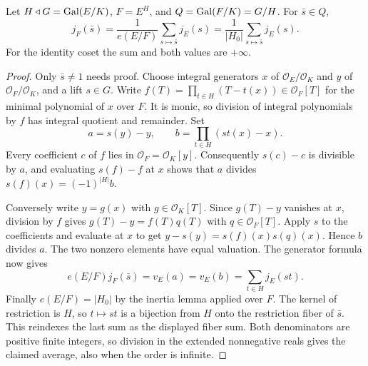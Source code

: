 \begin{lemma}
\label{fw:coset-ramification-average}
\leanok
Let $H\triangleleft G=\operatorname{Gal}(E/K)$, $F=E^H$, and $Q=\operatorname{Gal}(F/K)=G/H$.
For $\bar s\in Q$,
\[
 j_F(\bar s)=\frac1{e(E/F)}\sum_{s\mapsto\bar s}j_E(s)
            =\frac1{|H_0|}\sum_{s\mapsto\bar s}j_E(s).
\]
For the identity coset the sum and both values are $+\infty$.
\end{lemma}
\begin{proof}
Only $\bar s\ne1$ needs proof. Choose integral generators $x$ of
$\mathcal O_E/\mathcal O_K$ and $y$ of
$\mathcal O_F/\mathcal O_K$, and a lift $s\in G$.
Write $f(T)=\prod_{t\in H}(T-t(x))\in\mathcal O_F[T]$ for the
minimal polynomial of $x$ over $F$. It is monic, so division of integral
polynomials by $f$ has integral quotient and remainder.
Set
\[
 a=s(y)-y,\qquad b=\prod_{t\in H}(st(x)-x).
\]
Every coefficient $c$ of $f$ lies in $\mathcal O_F=\mathcal O_K[y]$.
Consequently $s(c)-c$ is divisible by $a$, and evaluating
$s(f)-f$ at $x$ shows that $a$ divides $s(f)(x)=(-1)^{|H|}b$.

Conversely write $y=g(x)$ with $g\in\mathcal O_K[T]$.
Since $g(T)-y$ vanishes at $x$, division by $f$ gives
$g(T)-y=f(T)q(T)$ with $q\in\mathcal O_F[T]$.
Apply $s$ to the coefficients and evaluate at $x$ to get
$y-s(y)=s(f)(x)s(q)(x)$. Hence $b$ divides $a$.
The two nonzero elements have equal valuation. The generator formula now
gives
\[
 e(E/F)j_F(\bar s)=v_E(a)=v_E(b)
       =\sum_{t\in H}j_E(st).
\]
Finally $e(E/F)=|H_0|$ by the inertia lemma applied over $F$.
The kernel of restriction is $H$, so $t\mapsto st$ is a bijection from
$H$ onto the restriction fiber of $\bar s$. This reindexes the last sum
as the displayed fiber sum. Both denominators are positive finite
integers, so division in the extended nonnegative reals gives the
claimed average, also when the order is infinite.
\end{proof}

